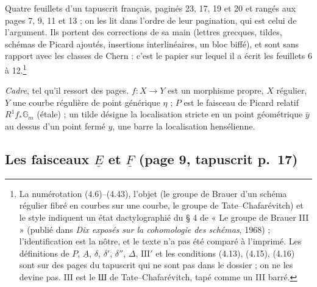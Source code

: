 \documentclass[11pt,a4paper]{article}
\begin{document}
Quatre feuillets d'un tapuscrit français, paginés 23, 17, 19 et 20 et rangés
aux pages 7, 9, 11 et 13 ; on les lit dans l'ordre de leur pagination, qui est
celui de l'argument. Ils portent des corrections de sa main (lettres
grecques, tildes, schémas de Picard ajoutés, insertions interlinéaires, un
bloc biffé), et sont sans rapport avec les classes de Chern : c'est le
papier sur lequel il a écrit les feuillets 6 à 12.\footnote{La numérotation
(4.6)--(4.43), l'objet (le groupe de Brauer d'un schéma régulier fibré en
courbes sur une courbe, le groupe de Tate--Chafarévitch) et le style
indiquent un état dactylographié du § 4 de « Le groupe de Brauer III »
(publié dans \emph{Dix exposés sur la cohomologie des schémas}, 1968) ;
l'identification est la nôtre, et le texte n'a pas été comparé à l'imprimé.
Les définitions de $P$, $\underline{A}$, $\delta$, $\delta'$, $\delta''$,
$\Delta$, $\mathrm{III}'$ et les conditions (4.13), (4.15), (4.16) sont sur
des pages du tapuscrit qui ne sont pas dans le dossier ; on ne les devine
pas. $\mathrm{III}$ est le Ш de Tate--Chafarévitch, tapé comme un III barré.}

\emph{Cadre}, tel qu'il ressort des pages. $f : X \to Y$ est un morphisme
propre, $X$ régulier, $Y$ une courbe régulière de point générique $\eta$ ;
$P$ est le faisceau de Picard relatif $R^{1}f_{*}\mathbb{G}_{m}$ (étale) ; un
tilde désigne la localisation stricte en un point géométrique $\bar{y}$ au
dessus d'un point fermé $y$, une barre la localisation hensélienne.

\subsection*{Les faisceaux $\underline{E}$ et $\underline{F}$ (page 9, tapuscrit p.\ 17)}
\end{document}
